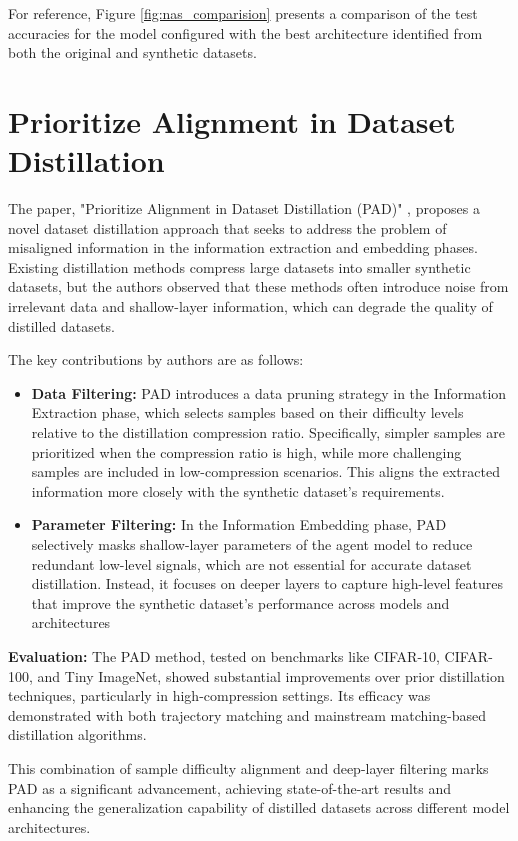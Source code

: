 \documentclass[conference, compsoc]{IEEEtran}
\begin{document}
	For reference, Figure \ref{fig:nas_comparision} presents a comparison of the test accuracies for the model configured with the best architecture identified from both the original and synthetic datasets.
	\section{Prioritize Alignment in Dataset Distillation}
		The paper, "Prioritize Alignment in Dataset Distillation (PAD)" \cite{li2024prioritizealignmentdatasetdistillation}, proposes a novel dataset distillation approach that seeks to address the problem of misaligned information in the information extraction and embedding phases. Existing distillation methods compress large datasets into smaller synthetic datasets, but the authors observed that these methods often introduce noise from irrelevant data and shallow-layer information, which can degrade the quality of distilled datasets.
	
	The key contributions by authors are as follows:
	\begin{itemize}
		\item \textbf{Data Filtering:} PAD introduces a data pruning strategy in the Information Extraction phase, which selects samples based on their difficulty levels relative to the distillation compression ratio. Specifically, simpler samples are prioritized when the compression ratio is high, while more challenging samples are included in low-compression scenarios. This aligns the extracted information more closely with the synthetic dataset's requirements.
		\item \textbf{Parameter Filtering:} In the Information Embedding phase, PAD selectively masks shallow-layer parameters of the agent model to reduce redundant low-level signals, which are not essential for accurate dataset distillation. Instead, it focuses on deeper layers to capture high-level features that improve the synthetic dataset's performance across models and architectures
	\end{itemize}
	
	\textbf{Evaluation:} The PAD method, tested on benchmarks like CIFAR-10, CIFAR-100, and Tiny ImageNet, showed substantial improvements over prior distillation techniques, particularly in high-compression settings. Its efficacy was demonstrated with both trajectory matching and mainstream matching-based distillation algorithms.
	
	This combination of sample difficulty alignment and deep-layer filtering marks PAD as a significant advancement, achieving state-of-the-art results and enhancing the generalization capability of distilled datasets across different model architectures.
	
\end{document}

